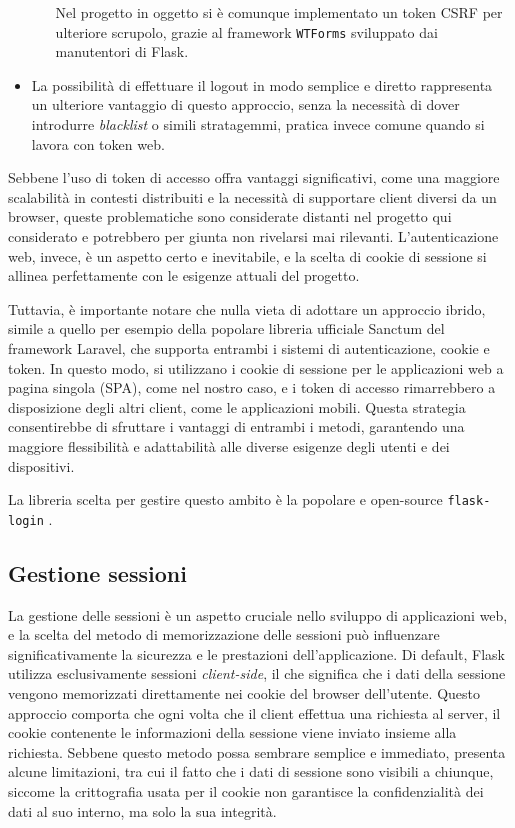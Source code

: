 \begin{itemize}
\begin{itemize}
        Nel progetto in oggetto si è comunque implementato un token CSRF per ulteriore scrupolo, grazie al framework \texttt{WTForms} sviluppato dai manutentori di Flask.
    \end{itemize}
    \item La possibilità di effettuare il logout in modo semplice e diretto rappresenta un ulteriore vantaggio di questo approccio, senza la necessità di dover introdurre \emph{blacklist} o simili stratagemmi, pratica invece comune quando si lavora con token web.
\end{itemize}

Sebbene l'uso di token di accesso offra vantaggi significativi, come una maggiore scalabilità in contesti distribuiti e la necessità di supportare client diversi da un browser, queste problematiche sono considerate distanti nel progetto qui considerato e potrebbero per giunta non rivelarsi mai rilevanti. L'autenticazione web, invece, è un aspetto certo e inevitabile, e la scelta di cookie di sessione si allinea perfettamente con le esigenze attuali del progetto.

Tuttavia, è importante notare che nulla vieta di adottare un approccio ibrido, simile a quello per esempio della popolare libreria ufficiale Sanctum del framework Laravel, che supporta entrambi i sistemi di autenticazione, cookie e token. In questo modo, si utilizzano i cookie di sessione per le applicazioni web a pagina singola (SPA), come nel nostro caso, e i token di accesso rimarrebbero a disposizione degli altri client, come le applicazioni mobili. Questa strategia consentirebbe di sfruttare i vantaggi di entrambi i metodi, garantendo una maggiore flessibilità e adattabilità alle diverse esigenze degli utenti e dei dispositivi.

La libreria scelta per gestire questo ambito è la popolare e open-source \texttt{flask-login} \cite{flask-login}.

\subsection{Gestione sessioni}
La gestione delle sessioni è un aspetto cruciale nello sviluppo di applicazioni web, e la scelta del metodo di memorizzazione delle sessioni può influenzare significativamente la sicurezza e le prestazioni dell'applicazione. Di default, Flask utilizza esclusivamente sessioni \emph{client-side}, il che significa che i dati della sessione vengono memorizzati direttamente nei cookie del browser dell'utente. Questo approccio comporta che ogni volta che il client effettua una richiesta al server, il cookie contenente le informazioni della sessione viene inviato insieme alla richiesta. Sebbene questo metodo possa sembrare semplice e immediato, presenta alcune limitazioni, tra cui il fatto che i dati di sessione sono visibili a chiunque, siccome la crittografia usata per il cookie non garantisce la confidenzialità dei dati al suo interno, ma solo la sua integrità.

